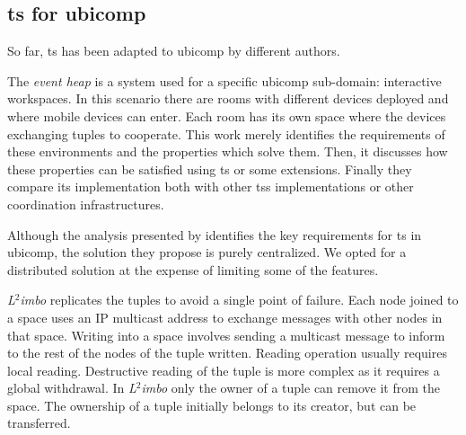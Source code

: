 \subsection{\acl{ts} for \ac{ubicomp}}

So far, \acl{ts} has been adapted to \acl{ubicomp} by different authors.




The \emph{event heap} \citep{johanson_extending_2004} is a system used for a specific \ac{ubicomp} sub-domain: interactive workspaces.
In this scenario there are rooms with different devices deployed and where mobile devices can enter.
Each room has its own space where the devices exchanging tuples to cooperate.
This work merely identifies the requirements of these environments and the properties which solve them.
Then, it discusses how these properties can be satisfied using \ac{ts} or some extensions.
Finally they compare its implementation both with other \acp{ts} implementations or other coordination infrastructures. %

Although the analysis presented by \citeauthor{johanson_extending_2004} identifies the key requirements for \ac{ts} in \ac{ubicomp},
the solution they propose is purely centralized.
We opted for a distributed solution at the expense of limiting some of the features.


\emph{L$^2$imbo} \citep{davies_l2imbo:_1998,friday_experiences_1999} replicates the tuples to avoid a single point of failure.
Each node joined to a space uses an IP multicast address to exchange messages with other nodes in that space.
Writing into a space involves sending a multicast message to inform to the rest of the nodes of the tuple written.
Reading operation usually requires local reading.
Destructive reading of the tuple is more complex as it requires a global withdrawal.
In \emph{L$^2$imbo} only the owner of a tuple can remove it from the space.
The ownership of a tuple initially belongs to its creator, but can be transferred. %


